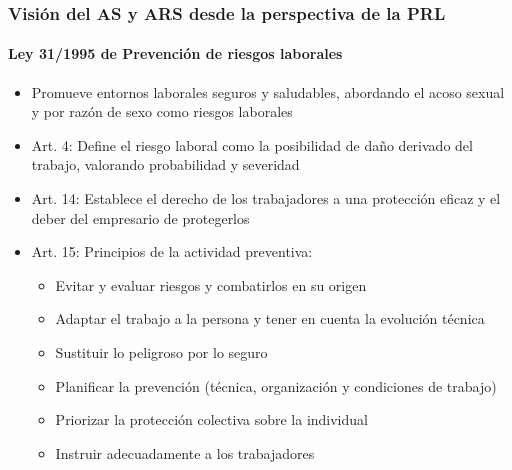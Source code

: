 \documentclass{beamer}
\newcommand{\highlight}[1]{{\color{Blue} #1}}
\begin{document}
    \begin{frame}
        \frametitle{Visión del AS y ARS desde la perspectiva de la PRL}
        \framesubtitle{Ley 31/1995 de Prevención de riesgos laborales}
        \begin{itemize}
            \item Promueve entornos laborales seguros y saludables, abordando el acoso sexual y por razón de sexo como riesgos laborales
            \item \highlight{Art. 4}: Define el riesgo laboral como la posibilidad de daño derivado del trabajo, valorando probabilidad y severidad
            \item \highlight{Art. 14}: Establece el derecho de los trabajadores a una protección eficaz y el deber del empresario de protegerlos
            \item \highlight{Art. 15}: Principios de la actividad preventiva:
            \begin{itemize}
                \item Evitar y evaluar riesgos y combatirlos en su origen
                \item Adaptar el trabajo a la persona y tener en cuenta la evolución técnica
                \item Sustituir lo peligroso por lo seguro
                \item Planificar la prevención (técnica, organización y condiciones de trabajo)
                \item Priorizar la protección colectiva sobre la individual
                \item Instruir adecuadamente a los trabajadores
            \end{itemize}
        \end{itemize}
    \end{frame}
\end{document}
